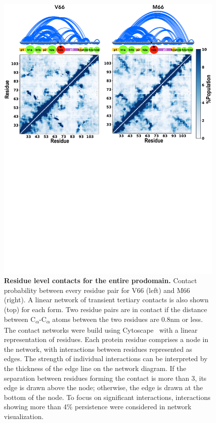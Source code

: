 \documentclass[10pt,letterpaper]{article}
\begin{document}
 \begin{figure}[!ht]
\includegraphics[scale=0.5,width=\textwidth,trim={0 0cm 0 0cm},clip]{../figures/S5.pdf}
\caption{{\bf Residue level contacts for the entire prodomain.} Contact probability between every residue pair for V66 (left) and M66 (right). A linear network of transient tertiary contacts is also shown (top) for each form. Two residue pairs are in contact if the distance between C\textsubscript{$\alpha$}-C\textsubscript{$\alpha$} atoms between the two residues are 0.8nm or less. The contact networks were build using Cytoscape~\cite{Ahlstrom2013} with a linear representation of residues. Each protein residue comprises a node in the network, with interactions between residues represented as edges. The strength of individual interactions can be interpreted by the thickness of the edge line on the network diagram. If the separation between residues forming the contact is more than 3, its edge is drawn above the node; otherwise, the edge is drawn at the bottom of the node. To focus on significant interactions, interactions showing more than 4\% persistence were considered in network visualization.}
\label{S6} 
\end{figure}
\end{document}
